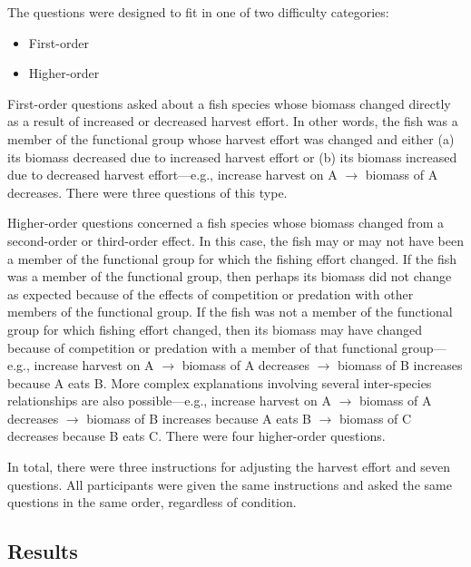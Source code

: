 The questions were designed to fit in one of two difficulty categories:
\begin{itemize}
\item First-order
\item Higher-order
\end{itemize}

First-order questions asked about a fish species whose biomass changed directly as a result of increased or decreased harvest effort.  In other words, the fish was a member of the functional group whose harvest effort was changed and either (a) its biomass decreased due to increased harvest effort or (b) its biomass increased due to decreased harvest effort---e.g.,  increase harvest on A $\rightarrow$ biomass of A decreases.  There were three questions of this type.

Higher-order questions concerned a fish species whose biomass changed from a second-order or third-order effect.  In this case, the fish may or may not have been a member of the functional group for which the fishing effort changed.  If the fish was a member of the functional group, then perhaps its biomass did not change as expected because of the effects of competition or predation with other members of the functional group.  If the fish was not a member of the functional group for which fishing effort changed, then its biomass may have changed because of competition or predation with a member of that functional group---e.g., increase harvest on A $\rightarrow$ biomass of A decreases $\rightarrow$ biomass of B increases because A eats B.  More complex explanations involving several inter-species relationships are also possible---e.g., increase harvest on A $\rightarrow$ biomass of A decreases $\rightarrow$ biomass of B increases because A eats B $\rightarrow$ biomass of C decreases because B eats C.  There were four higher-order questions. 

In total, there were three instructions for adjusting the harvest effort and seven questions.  All participants were given the same instructions and asked the same questions in the same order, regardless of condition.

\subsection{Results}

